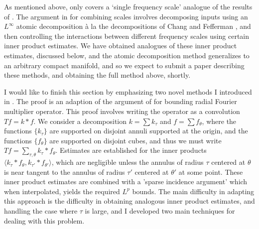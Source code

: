 \documentclass[11pt]{article}
\begin{document}
As mentioned above, \cite{DensonCharacterization} only covers a `single frequency scale' analogue of the results of \cite{HeoNazarovSeeger}. The argument in \cite{HeoNazarovSeeger} for combining scales involves decomposing inputs using an $L^\infty$ atomic decomposition à la the decompositions of Chang and Fefferman \cite{ChangFefferman}, and then controlling the interactions between different frequency scales using certain inner product estimates. We have obtained analogues of these inner product estimates, discussed below, and the atomic decomposition method generalizes to an arbitrary compact manifold, and so we expect to submit a paper describing these methods, and obtaining the full method above, shortly.


I would like to finish this section by emphasizing two novel methods I introduced in \cite{DensonCharacterization}. The proof is an adaption of the argument of \cite{HeoNazarovSeeger} for bounding radial Fourier multiplier operator. This proof involves writing the operator as a convolution $Tf = k * f$. We consider a decomposition $k = \sum k_\tau$ and $f = \sum f_\theta$, where the functions $\{ k_\tau \}$ are supported on disjoint annuli supported at the origin, and the functions $\{ f_\theta \}$ are supported on disjoint cubes, and thus we must write $T f = \sum_{\tau,\theta} k_\tau * f_\theta$. Estimates are established for the inner products $\langle k_\tau * f_\theta, k_{\tau'} * f_{\theta'} \rangle$, which are negligible unless the annulus of radius $\tau$ centered at $\theta$ is near tangent to the annulus of radius $\tau'$ centered at $\theta'$ at some point. These inner product estimates are combined with a 'sparse incidence argument' which when interpolated, yields the required $L^p$ bounds. The main difficulty in adapting this approach is the difficulty in obtaining analogous inner product estimates, and handling the case where $\tau$ is large, and I developed two main techniques for dealing with this problem.

\end{document}
